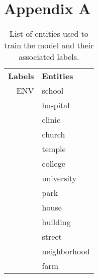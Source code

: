 \chapter{Appendix A}
\begin{center}
    \begin{longtable}{rl}
        \caption{List of entities used to train the model and their associated labels.} \label{table:crisis-vocab} \\
        \textbf{Labels} & \textbf{Entities}                                                                        \\
        ENV             & school                                                                                   \\
                        & hospital                                                                                 \\
                        & clinic                                                                                   \\
                        & church                                                                                   \\
                        & temple                                                                                   \\
                        & college                                                                                  \\
                        & university                                                                               \\
                        & park                                                                                     \\
                        & house                                                                                    \\
                        & building                                                                                 \\
                        & street                                                                                   \\
                        & neighborhood                                                                             \\
                        & farm                                                                                     \\

\end{longtable}
\end{center}

